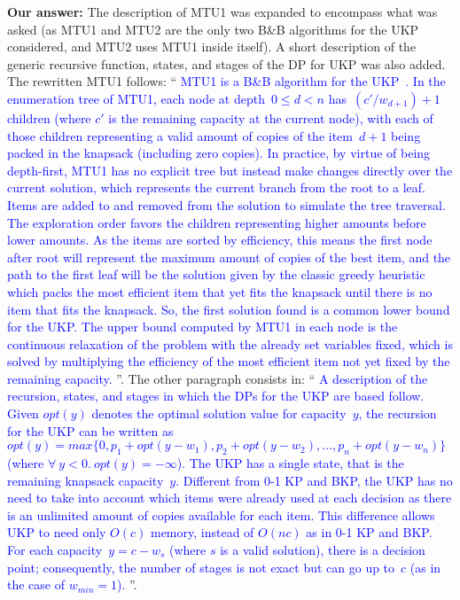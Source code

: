 \documentclass{elsarticle}
\begin{document}
\textbf{Our answer:} The description of MTU1 was expanded to encompass what was asked (as MTU1 and MTU2 are the only two B\&B algorithms for the UKP considered, and MTU2 uses MTU1 inside itself). A short description of the generic recursive function, states, and stages of the DP for UKP was also added. The rewritten MTU1 follows: ``\textcolor{blue}{
MTU1 is a B\&B algorithm for the UKP~\citep{mtu1}. %
In the enumeration tree of MTU1, each node at depth~\(0 \leq d < n\) has~\((c'/w_{d+1}) + 1\) children (where \(c'\) is the remaining capacity at the current node), with each of those children representing a valid amount of copies of the item~\(d+1\) being packed in the knapsack (including zero copies).
In practice, by virtue of being depth-first, MTU1 has no explicit tree but instead make changes directly over the current solution, which represents the current branch from the root to a leaf.
Items are added to and removed from the solution to simulate the tree traversal.
The exploration order favors the children representing higher amounts before lower amounts.
As the items are sorted by efficiency, this means the first node after root will represent the maximum amount of copies of the best item, and the path to the first leaf will be the solution given by the classic greedy heuristic which packs the most efficient item that yet fits the knapsack until there is no item that fits the knapsack. So, the first solution found is a common lower bound for the UKP.
The upper bound computed by MTU1 in each node is the continuous relaxation of the problem with the already set variables fixed, which is solved by multiplying the efficiency of the most efficient item not yet fixed by the remaining capacity.
}''.
The other paragraph consists in: ``\textcolor{blue}{
A description of the recursion, states, and stages in which the DPs for the UKP are based follow.
Given \(opt(y)\) denotes the optimal solution value for capacity~\(y\), the recursion for the UKP can be written as \(opt(y) = max \{0, p_1 + opt(y - w_1), p_2 + opt(y - w_2), \dots, p_n + opt(y - w_n)\}\) (where \(\forall~y < 0.~opt(y) = -\infty\)).
The UKP has a single state, that is the remaining knapsack capacity~\(y\).
Different from 0-1 KP and BKP, the UKP has no need to take into account which items were already used at each decision as there is an unlimited amount of copies available for each item.
This difference allows UKP to need only \(O(c)\) memory, instead of \(O(nc)\) as in 0-1 KP and BKP.
For each capacity~\(y = c - w_s\) (where \(s\) is a valid solution), there is a decision point; consequently, the number of stages is not exact but can go up to~\(c\) (as in the case of \(w_{min} = 1\)).
}''.
\medskip
\end{document}
